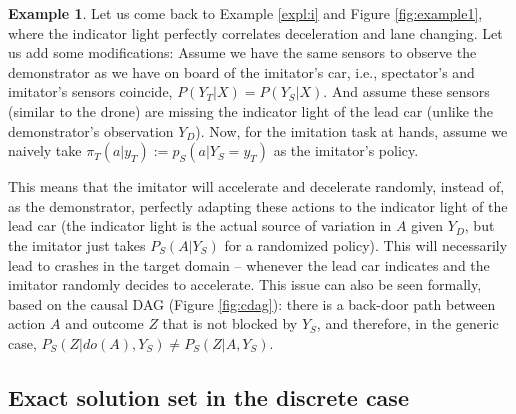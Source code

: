 \documentclass[letterpaper]{article} %
\theoremstyle{definition}%
\theoremstyle{definition}
\newtheorem{example}{Example}
\newcommand{\dob}[1]{do(#1)}
\newcommand{\Obs}{Y}
\newcommand{\obs}{y}
\newcommand{\Out}{Z}
\newcommand{\todo}[1]{\textcolor{red}{#1}}
\begin{document}
\begin{example}
Let us come back to Example \ref{expl:i} and Figure \ref{fig:example1}, where the indicator light perfectly correlates deceleration and lane changing. Let us add some modifications:
%
Assume we have the same sensors to observe the demonstrator as we have on board of the imitator's car, i.e., spectator's and imitator's sensors coincide, $P(Y_T|X) = P(Y_S|X)$.
And assume these sensors (similar to the drone) are missing the indicator light of the lead car (unlike the demonstrator's observation $Y_D$). %
Now, for the imitation task at hands, assume we naively take $\pi_T(a|\obs_T) := p_S(a | \Obs_S = \obs_T )$ as the imitator's policy.

This means that the imitator will accelerate and decelerate randomly, instead of, as the demonstrator, perfectly adapting these actions to the indicator light of the lead car (the indicator light is the actual source of variation in $A$ given $Y_D$, but the imitator just takes $P_S(A|Y_S)$ for a randomized policy). This will necessarily lead to crashes in the target domain -- whenever the lead car indicates and the imitator randomly decides to accelerate.
This issue can also be seen formally, based on the causal DAG (Figure \ref{fig:cdag}): there is a back-door path \cite{pearl2009causality} between action $A$ and outcome $Z$ that is not blocked by $Y_S$, and therefore, in the generic case, $P_S(\Out| \dob{A}, Y_S) \neq P_S(\Out| A, Y_S)$.
\end{example}


\subsection{Exact solution set in the discrete case}
\label{sec:imex}
\end{document}
